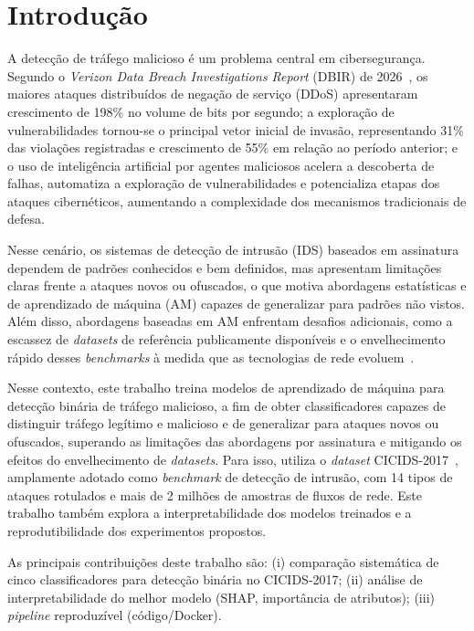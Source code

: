 \documentclass[12pt]{article}
\makeatletter
\newlength{\sbcblockmargin}
\newenvironment{sbcnarrowblock}{%
  \list{}{%
    \topsep\z@
    \partopsep\z@
    \itemsep\z@
    \parsep\z@
    \leftmargin=\sbcblockmargin
    \rightmargin=\sbcblockmargin
    \listparindent=\parindent
    \itemindent=\z@
    \labelwidth=\z@
    \labelsep=\z@
  }\item\relax}
{\endlist}
\makeatother
\begin{document}
\begin{sbcnarrowblock}
\section{Introdução}
\label{sec:introduction}

A detecção de tráfego malicioso é um problema central em cibersegurança.
Segundo o \textit{Verizon Data Breach Investigations Report} (DBIR) de 2026~\cite{verizon2026dbir}, os maiores ataques distribuídos de negação de serviço (DDoS) apresentaram crescimento de 198\% no volume de bits por segundo; a exploração de vulnerabilidades tornou-se o principal vetor inicial de invasão, representando 31\% das violações registradas e crescimento de 55\% em relação ao período anterior; e o uso de inteligência artificial por agentes maliciosos acelera a descoberta de falhas, automatiza a exploração de vulnerabilidades e potencializa etapas dos ataques cibernéticos, aumentando a complexidade dos mecanismos tradicionais de defesa.

Nesse cenário, os sistemas de detecção de intrusão (IDS) baseados em assinatura dependem de padrões conhecidos e bem definidos, mas apresentam limitações claras frente a ataques novos ou ofuscados, o que motiva abordagens estatísticas e de aprendizado de máquina (AM) capazes de generalizar para padrões não vistos.
Além disso, abordagens baseadas em AM enfrentam desafios adicionais, como a escassez de \textit{datasets} de referência publicamente disponíveis e o envelhecimento rápido desses \textit{benchmarks} à medida que as tecnologias de rede evoluem~\cite{he2023adversarial}.

Nesse contexto, este trabalho treina modelos de aprendizado de máquina para detecção binária de tráfego malicioso, a fim de obter classificadores capazes de distinguir tráfego legítimo e malicioso e de generalizar para ataques novos ou ofuscados, superando as limitações das abordagens por assinatura e mitigando os efeitos do envelhecimento de \textit{datasets}.
Para isso, utiliza o \textit{dataset} CICIDS-2017~\cite{sharafaldin2018toward}, amplamente adotado como \textit{benchmark} de detecção de intrusão, com 14 tipos de ataques rotulados e mais de 2 milhões de amostras de fluxos de rede.
Este trabalho também explora a interpretabilidade dos modelos treinados e a reprodutibilidade dos experimentos propostos.

As principais contribuições deste trabalho são: (i) comparação sistemática de cinco classificadores para detecção binária no CICIDS-2017; (ii) análise de interpretabilidade do melhor modelo (SHAP, importância de atributos); (iii) \textit{pipeline} reproduzível (código/Docker).


\end{sbcnarrowblock}
\end{document}
